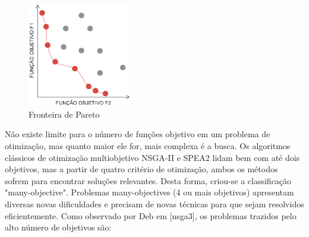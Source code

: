 \begin{figure}
	\label{fig_pareto}
	\caption{Fronteira de Pareto}
	\centering
	\includegraphics[width=0.4\textwidth]{cap_otimizacao-multi/figs/pareto}
\end{figure}

Não existe limite para o número de funções objetivo em um problema de otimização, mas quanto maior ele for, mais complexa é a busca. Os algoritmos clássicos de otimização multiobjetivo NSGA-II e SPEA2 lidam bem com até dois objetivos, mas a partir de quatro critério de otimização, ambos os métodos sofrem para encontrar soluções relevantes. Desta forma, criou-se a classificação "many-objective". Problemas many-objectives (4 ou mais objetivos) apresentam diversas novas dificuldades e precisam de novas técnicas para que sejam resolvidos eficientemente. Como observado por Deb em [nsga3], os problemas trazidos pelo alto número de objetivos são:

